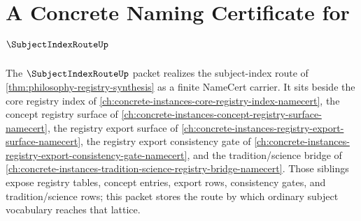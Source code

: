 \chapter{A Concrete Naming Certificate for $\SubjectIndexRouteUp$}
\label{ch:concrete-instances-subject-index-route-namecert}

The $\SubjectIndexRouteUp$ packet realizes the subject-index route of \autoref{thm:philosophy-registry-synthesis} as a finite NameCert carrier. It sits beside the core registry index of \autoref{ch:concrete-instances-core-registry-index-namecert}, the concept registry surface of \autoref{ch:concrete-instances-concept-registry-surface-namecert}, the registry export surface of \autoref{ch:concrete-instances-registry-export-surface-namecert}, the registry export consistency gate of \autoref{ch:concrete-instances-registry-export-consistency-gate-namecert}, and the tradition/science bridge of \autoref{ch:concrete-instances-tradition-science-registry-bridge-namecert}. Those siblings expose registry tables, concept entries, export rows, consistency gates, and tradition/science rows; this packet stores the route by which ordinary subject vocabulary reaches that lattice.

